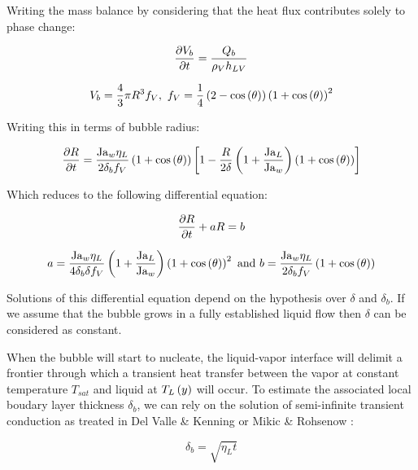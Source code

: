 Writing the mass balance by considering that the heat flux contributes solely to phase change:

\begin{align}
\frac{\partial{V_{b}}}{\partial t}=\frac{Q_{b}}{\rho_{V}h_{LV}}
\end{align}

\begin{equation}
V_{b} = \frac{4}{3}\pi R^{3} f_{V},\ f_{V} = \frac{1}{4}\parth{2-\cos{\theta}}\parth{1+\cos{\theta}}^{2}
\end{equation}

Writing this in terms of bubble radius:

\begin{align}
\frac{\partial{R}}{\partial t} = \frac{\mathrm{Ja}_{w} \eta_{L}}{2 \delta_{b} f_{V} } \left( 1+\mathrm{cos}\left( \theta \right) \right) \left[ 1 - \frac{R}{2\delta}\left(  1 + \frac{\mathrm{Ja}_{L}}{\mathrm{Ja}_{w}}  \right) \left(  1 + \mathrm{cos}\left( \theta \right)  \right)  \right]
\end{align}

Which reduces to the following differential equation:

\begin{equation}
\frac{\partial{R}}{\partial t} + aR = b
\label{eq:diff_eq_growth}
\end{equation}

\begin{equation}
a = \frac{\mathrm{Ja}_{w}\eta_{L}}{4 \delta_{b} \delta f_{V} } \left( 1 + \frac{\mathrm{Ja}_{L}}{\mathrm{Ja}_{w}}  \right) \left( 1 + \mathrm{cos}\left( \theta \right)  \right)^{2} \ \text{and} \  b = \frac{\mathrm{Ja}_{w}\eta_{L}}{2 \delta_{b} f_{V} }\left( 1 + \mathrm{cos}\left( \theta \right)  \right)
\end{equation}


\npar

Solutions of this differential equation depend on the hypothesis over $\delta$ and $\delta_{b}$. If we assume that the bubble grows in a fully established liquid flow then $\delta$ can be considered as constant.

When the bubble will start to nucleate, the liquid-vapor interface will delimit a frontier through which a transient heat transfer between the vapor at constant temperature $T_{sat}$ and liquid at $T_{L}\left( y \right)$ will occur. To estimate the associated local boudary layer thickness $\delta_{b}$, we can rely on the solution of semi-infinite transient conduction as treated in Del Valle \& Kenning \cite{del_valle_subcooled_1985} or Mikic \& Rohsenow \cite{mikic_bubble_1970}:

\begin{equation}
\delta_{b} = \sqrt{\eta_{L}t}
\label{eq:TBL_expgrowth}
\end{equation}

